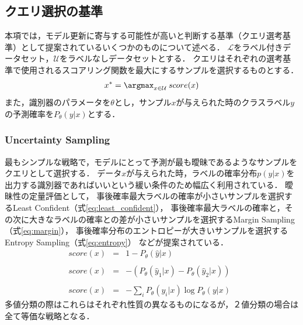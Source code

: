 \subsection{クエリ選択の基準}
\label{query_strategy}
本項では，モデル更新に寄与する可能性が高いと判断する基準（クエリ選考基準）として提案されているいくつかのものについて述べる．
$\mathcal{L}$をラベル付きデータセット，$\mathcal{U}$をラベルなしデータセットとする．
クエリはそれぞれの選考基準で使用されるスコアリング関数を最大にするサンプルを選択するものとする．
\begin{eqnarray}
    x^{*} = \argmax_{x \in \mathcal{U}} \: score(x)
\end{eqnarray}
また，識別器のパラメータを$\theta$とし，サンプル$x$が与えられた時のクラスラベル$y$の予測確率を$P_{\theta}(y|x)$とする．

\subsubsection{Uncertainty Sampling \cite{lewis1994sequential}} 
最もシンプルな戦略で，モデルにとって予測が最も曖昧であるようなサンプルをクエリとして選択する．
データ$x$が与えられた時，ラベルの確率分布$p(y|x)$を出力する識別器であればいいという緩い条件のため幅広く利用されている．
曖昧性の定量評価として，
事後確率最大ラベルの確率が小さいサンプルを選択するLeast Confident（式\ref{eq:least_confident}），
事後確率最大ラベルの確率と，その次に大きなラベルの確率との差が小さいサンプルを選択するMargin Sampling（式\ref{eq:margin}），
事後確率分布のエントロピーが大きいサンプルを選択するEntropy Sampling（式\ref{eq:entropy}）
などが提案されている．
\begin{eqnarray}
    score(x) &=& 1 - P_{\theta}(\hat{y}|x)  \;\;  \label{eq:least_confident} \\ \nonumber \\ 
    score(x) &=& - (P_{\theta}(\hat{y}_1|x) - P_{\theta}(\hat{y}_2|x) )  \;\;  \label{eq:margin}\\ \nonumber \\
    score(x) &=& - \sum_i {P_{\theta}(y_i|x)} \log P_{\theta}(y|x)  \;\;  \label{eq:entropy}
\end{eqnarray}
多値分類の際はこれらはそれぞれ性質の異なるものになるが，２値分類の場合は全て等価な戦略となる．

